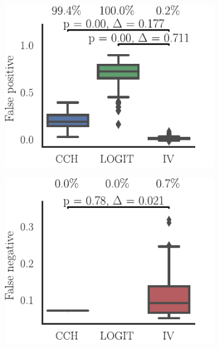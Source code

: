 \documentclass[11pt]{article}
\begin{document}
\begin{figure}
\makeatletter
\renewcommand\p@subfigure{}
\makeatother
\begin{subfigure}{0.485\textwidth} \includegraphics[scale=1]{false_positive}
\caption{} \label{fig:network-class:1}
\end{subfigure}\hfill
\begin{subfigure}{0.485\textwidth} \includegraphics[scale=1]{false_negative}
\caption{} \label{fig:network-class:2}
\end{subfigure}


\end{figure}
\end{document}
